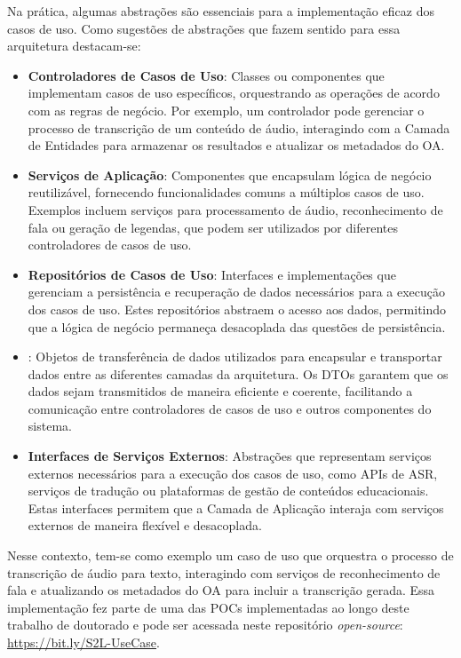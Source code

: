 Na prática, algumas abstrações são essenciais para a implementação eficaz dos casos de uso. Como sugestões de abstrações que fazem sentido para essa arquitetura destacam-se:

\begin{itemize}
    \item \textbf{Controladores de Casos de Uso}: Classes ou componentes que implementam casos de uso específicos, orquestrando as operações de acordo com as regras de negócio. Por exemplo, um controlador pode gerenciar o processo de transcrição de um conteúdo de áudio, interagindo com a Camada de Entidades para armazenar os resultados e atualizar os metadados do OA.

    \item \textbf{Serviços de Aplicação}: Componentes que encapsulam lógica de negócio reutilizável, fornecendo funcionalidades comuns a múltiplos casos de uso. Exemplos incluem serviços para processamento de áudio, reconhecimento de fala ou geração de legendas, que podem ser utilizados por diferentes controladores de casos de uso.

    \item \textbf{Repositórios de Casos de Uso}: Interfaces e implementações que gerenciam a persistência e recuperação de dados necessários para a execução dos casos de uso. Estes repositórios abstraem o acesso aos dados, permitindo que a lógica de negócio permaneça desacoplada das questões de persistência.

    \item \textbf{}: Objetos de transferência de dados utilizados para encapsular e transportar dados entre as diferentes camadas da arquitetura. Os DTOs garantem que os dados sejam transmitidos de maneira eficiente e coerente, facilitando a comunicação entre controladores de casos de uso e outros componentes do sistema.

    \item \textbf{Interfaces de Serviços Externos}: Abstrações que representam serviços externos necessários para a execução dos casos de uso, como APIs de ASR, serviços de tradução ou plataformas de gestão de conteúdos educacionais. Estas interfaces permitem que a Camada de Aplicação interaja com serviços externos de maneira flexível e desacoplada.
\end{itemize}

Nesse contexto, tem-se como exemplo um caso de uso que orquestra o processo de transcrição de áudio para texto, interagindo com serviços de reconhecimento de fala e atualizando os metadados do OA para incluir a transcrição gerada. Essa implementação fez parte de uma das POCs implementadas ao longo deste trabalho de doutorado e pode ser acessada neste repositório \textit{open-source}: \url{https://bit.ly/S2L-UseCase}.

